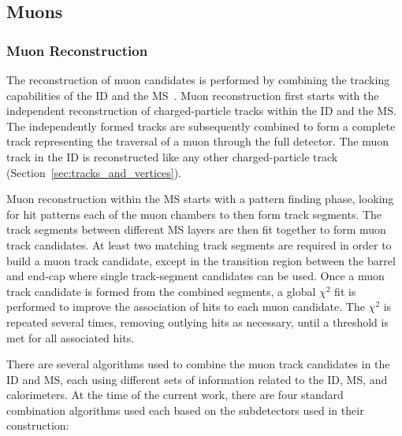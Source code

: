 \subsection{Muons}
\label{sec:muons}

\subsubsection{Muon Reconstruction}
\label{sec:muon_reco}

The reconstruction of muon candidates is performed by combining the tracking
capabilities of the ID and the MS~\cite{Aad:2016jkr}.
Muon reconstruction first starts with the independent reconstruction of
charged-particle tracks within the ID and the MS.
The independently formed tracks are subsequently combined to form a complete
track representing the traversal of a muon through the full detector.
The muon track in the ID is reconstructed like any other charged-particle track (Section~\ref{sec:tracks_and_vertices}).

Muon reconstruction within the MS starts with a pattern finding phase, looking for
hit patterns each of the muon chambers to then form track segments.
The track segments between different MS layers are then fit together to form muon track candidates.
At least two matching track segments are required in order to build a muon
track candidate, except in the transition region between the barrel and end-cap where
single track-segment candidates can be used.
Once a muon track candidate is formed from the combined segments, a global $\chi^2$ fit is
performed to improve the association of hits to each muon candidate.
The $\chi^2$ is repeated several times, removing outlying hits as necessary, until a
threshold is met for all associated hits.

There are several algorithms used to combine the muon track candidates in the ID and MS, each
using different sets of information related to the ID, MS, and calorimeters.
At the time of the current work, there are four standard combination algorithms used
each based on the subdetectors used in their construction:

